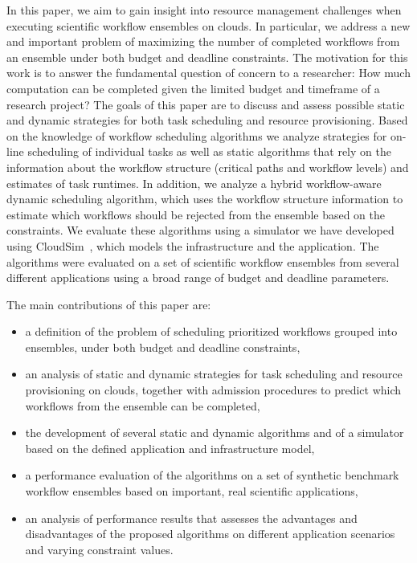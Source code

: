 \documentclass{sig-alternate}
\begin{document}
In this paper, we aim to gain insight into resource management challenges when executing 
scientific workflow ensembles on clouds. In particular, we address a new and important 
problem of maximizing the number of completed workflows from an ensemble under both budget and
deadline constraints. The motivation for this work is to answer the fundamental question of 
concern to a researcher: How much computation can be completed given the limited budget and 
timeframe of a research project? The goals of this paper are to discuss and assess possible
static and dynamic strategies for both task scheduling and resource
provisioning. Based on the knowledge of workflow scheduling algorithms we
analyze strategies for on-line scheduling of individual tasks as well as static
algorithms that rely on the information about the workflow structure (critical
paths and workflow levels) and estimates of task runtimes. In addition, we
analyze a hybrid workflow-aware dynamic scheduling algorithm, which uses the
workflow structure information to estimate which workflows should be rejected
from the ensemble based on the constraints. We evaluate these algorithms using a
simulator we have developed using CloudSim~\cite{Calheiros11}, which models the 
infrastructure and the application. The algorithms were evaluated on a set 
of scientific workflow ensembles from several different applications using a 
broad range of budget and deadline parameters. 

The main contributions of this paper are:
\begin{itemize}
  \item a definition of the problem of scheduling prioritized workflows grouped into
  ensembles, under both budget and deadline constraints,
  \item an analysis of static and dynamic strategies for task scheduling and
  resource provisioning on clouds, together with admission procedures to
  predict which workflows from the ensemble can be completed,
  \item the development of several static and dynamic algorithms and of a simulator based
  on the defined application and infrastructure model,
  \item a performance evaluation of the algorithms on a set of synthetic benchmark
  workflow ensembles based on important, real scientific applications,
  \item an analysis of performance results that assesses the advantages and
  disadvantages of the proposed algorithms on different application scenarios and
  varying constraint values.
\end{itemize}
\end{document}
